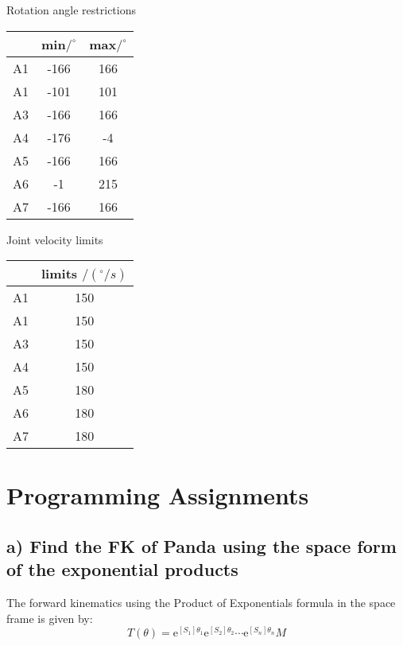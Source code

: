 \documentclass[english,10pt,a4paper]{article}
\begin{document}
    Rotation angle restrictions
    \begin{center}
        \begin{tabular}{|c|c|c|}
            \hline
            & min$/^\circ$& max$/^\circ$ \\
            \hline
            A1 & -166 & 166 \\
            \hline
            A1 & -101 & 101 \\
            \hline
            A3 & -166 & 166 \\
            \hline
            A4 & -176 & -4 \\
            \hline
            A5 & -166 & 166 \\
            \hline
            A6 & -1 & 215 \\
            \hline
            A7 & -166 & 166 \\
            \hline
        \end{tabular}
    \end{center}
    
    Joint velocity limits
    \begin{center}
    	\begin{tabular}{|c|c|}
    		\hline
    		& limits $/(^\circ/s)$ \\
    		\hline
    		A1 & 150 \\
    		\hline
    		A1 & 150 \\
    		\hline
    		A3 & 150 \\
    		\hline
    		A4 & 150 \\
    		\hline
    		A5 & 180 \\
    		\hline
    		A6 & 180 \\
    		\hline
    		A7 & 180 \\
    		\hline
    	\end{tabular}
    \end{center}
    
    \section{Programming Assignments}
    \subsection*{a) Find the FK of Panda using the space form of the exponential products}
	The forward kinematics using the Product of Exponentials formula in the space frame is given by:
	\begin{equation}
		T(\theta) = \mathrm{e}^{[S_1]\theta_1} \mathrm{e}^{[S_2]\theta_2} \cdots \mathrm{e}^{[S_n]\theta_n} M
	\end{equation}
	
\end{document}

